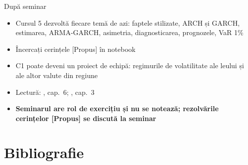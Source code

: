 \begin{frame}{După seminar}
\itemsize{\small}
\begin{itemize}
    \item Cursul 5 dezvoltă fiecare temă de azi: faptele stilizate, ARCH și GARCH, estimarea, ARMA-GARCH, asimetria, diagnosticarea, prognozele, VaR 1\%
    \item Încercați cerințele [Propus] în notebook
    \item C1 poate deveni un proiect de echipă: regimurile de volatilitate ale leului și ale altor valute din regiune
    \item Lectură: , cap.~6; , cap.~3
    \item \textbf{Seminarul are rol de exercițiu și nu se notează; rezolvările cerințelor [Propus] se discută la seminar}
\end{itemize}
\end{frame}


\section{Bibliografie}

